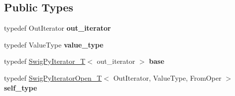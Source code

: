 \subsection*{Public Types}
\begin{DoxyCompactItemize}
\item 
typedef Out\+Iterator {\bfseries out\+\_\+iterator}\hypertarget{classswig_1_1SwigPyIteratorOpen__T_ad348022c40678f2217e0696c8b6bb59b}{}\label{classswig_1_1SwigPyIteratorOpen__T_ad348022c40678f2217e0696c8b6bb59b}

\item 
typedef Value\+Type {\bfseries value\+\_\+type}\hypertarget{classswig_1_1SwigPyIteratorOpen__T_ac5d08f0ecc1d014a83632411678103f3}{}\label{classswig_1_1SwigPyIteratorOpen__T_ac5d08f0ecc1d014a83632411678103f3}

\item 
typedef \hyperlink{classswig_1_1SwigPyIterator__T}{Swig\+Py\+Iterator\+\_\+T}$<$ out\+\_\+iterator $>$ {\bfseries base}\hypertarget{classswig_1_1SwigPyIteratorOpen__T_acee28cc32d3d9a19f711bd9df933b06c}{}\label{classswig_1_1SwigPyIteratorOpen__T_acee28cc32d3d9a19f711bd9df933b06c}

\item 
typedef \hyperlink{classswig_1_1SwigPyIteratorOpen__T}{Swig\+Py\+Iterator\+Open\+\_\+T}$<$ Out\+Iterator, Value\+Type, From\+Oper $>$ {\bfseries self\+\_\+type}\hypertarget{classswig_1_1SwigPyIteratorOpen__T_a232561380f04d1a22f772e24d6ff38e5}{}\label{classswig_1_1SwigPyIteratorOpen__T_a232561380f04d1a22f772e24d6ff38e5}

\end{DoxyCompactItemize}
